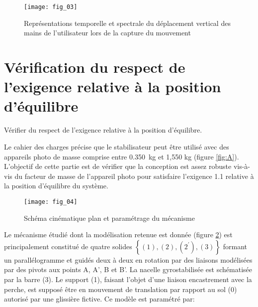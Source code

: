 \begin{figure}[H]
\centering
\texttt{[image: fig\_03]}
\caption{\label{fig:03} Représentations temporelle et spectrale du déplacement vertical des mains de l'utilisateur lors de la capture du mouvement}
\end{figure}
 
\ifprof
\begin{corrige}
\end{corrige}
\else
\fi

\ifprof
\begin{corrige}
\end{corrige}
\else
\fi

\section{\label{part:2} Vérification du respect de l'exigence relative à la position d'équilibre}
\begin{obj}
Vérifier du respect de l'exigence relative à la position d'équilibre.
\end{obj}
Le cahier des charges précise que le stabilisateur peut être utilisé avec des appareils photo de masse comprise entre \SI{0,350}{kg} et 1,550 kg (figure \ref{fig:A}). L'objectif de cette partie est de vérifier que la conception est assez robuste vis-à-vis du facteur de masse de l'appareil photo pour satisfaire l'exigence 1.1 relative à la position d'équilibre du système.


\begin{figure}[H]
\centering
\texttt{[image: fig\_04]}
\caption{\label{fig:04} Schéma cinématique plan et paramétrage du mécanisme}
\end{figure}



Le mécanisme étudié dont la modélisation retenue est donnée (figure \ref{fig:04}) est principalement constitué de quatre solides $\left\{(1),(2),\left(2^{\prime}\right),(3)\right\}$ formant un parallélogramme et guidés deux à deux en rotation par des liaisons modélisées par des pivots aux points A, A', B et B'. La nacelle gyrostabilisée est schématisée par la barre (3). Le support (1), faisant l'objet d'une liaison encastrement avec la perche, est supposé être en mouvement de translation par rapport au sol (0) autorisé par une glissière fictive. Ce modèle est paramétré par:


